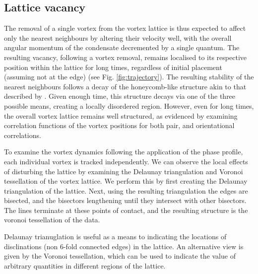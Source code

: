 
\subsection{Lattice vacancy}
The removal of a single vortex from the vortex lattice is thus expected to affect only the nearest neighbours by altering their velocity well, with the overall angular momentum of the condensate decremented by a single quantum. The resulting vacancy, following a vortex removal, remains localised to its respective position within the lattice for long times, regardless of initial placement (assuming not at the edge) (see Fig. \ref{fig:trajectory}). The resulting stability of the nearest neighbours follows a decay of the honeycomb-like structure akin to that described by \cite{Vtx:Leipold_jsm_2016}. Given enough time, this structure decays via one of the three possible means, creating a locally disordered region. However, even for long times, the overall vortex lattice remains well structured, as evidenced by examining correlation functions of the vortex positions for both pair, and orientational correlations.



To examine the vortex dynamics following the application of the phase profile, each individual vortex is tracked independently. We can observe the local effects of disturbing the lattice by examining the Delaunay triangulation and Voronoi tessellation of the vortex lattice. We perform this by first creating the Delaunay triangulation of the lattice. Next, using the resulting triangulation the edges are bisected, and the bisectors lengthening until they intersect with other bisectors. The lines terminate at these points of contact, and the resulting structure is the voronoi tessellation of the data. %



Delaunay trianuglation is useful as a means to indicating the locations of disclinations (non 6-fold connected edges) in the lattice.  An alternative view is given by the Voronoi tessellation, which can be used to indicate the value of arbitrary quantities in  different regions of the lattice.

